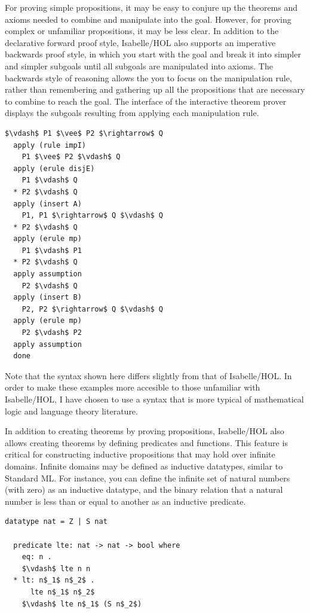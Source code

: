 \documentclass[letterpaper, 11pt]{report}
\begin{document}
For proving simple propositions, it may be easy to conjure up the theorems and axioms needed to
combine and manipulate into the goal. However, for proving complex or unfamiliar propositions,
it may be less clear. In addition to the declarative forward proof style, Isabelle/HOL also
supports an imperative backwards proof style, in which you start with the goal and break it into simpler
and simpler subgoals until all subgoals are manipulated into axioms. The backwards style of reasoning
allows the you to focus on the manipulation rule, rather than remembering and gathering up all the
propositions that are necessary to combine to reach the goal.
The interface of the interactive theorem prover displays the subgoals
resulting from applying each manipulation rule.


\begin{lstlisting}[language=logic, mathescape]
  $\vdash$ P1 $\vee$ P2 $\rightarrow$ Q
  apply (rule impI)
    P1 $\vee$ P2 $\vdash$ Q
  apply (erule disjE)
    P1 $\vdash$ Q
  * P2 $\vdash$ Q
  apply (insert A)
    P1, P1 $\rightarrow$ Q $\vdash$ Q
  * P2 $\vdash$ Q
  apply (erule mp)
    P1 $\vdash$ P1
  * P2 $\vdash$ Q
  apply assumption 
    P2 $\vdash$ Q
  apply (insert B)
    P2, P2 $\rightarrow$ Q $\vdash$ Q
  apply (erule mp)
    P2 $\vdash$ P2
  apply assumption 
  done
\end{lstlisting}

Note that the syntax shown here differs slightly from that of Isabelle/HOL.
In order to make these examples more accesible to those unfamiliar with Isabelle/HOL, I have chosen
to use a syntax that is more typical of mathematical logic and language theory literature.

In addition to creating theorems by proving propositions, Isabelle/HOL also allows creating theorems
by defining predicates and functions. This feature is critical for constructing inductive propositions that may hold
over infinite domains. Infinite domains may be defined as inductive datatypes, similar to Standard ML.
For instance, you can define the infinite set of natural numbers (with zero) as an inductive datatype,
and the binary relation that a natural number is less than or equal to another as an inductive predicate.

\begin{lstlisting}[language=logic]
  datatype nat = Z | S nat
  
  predicate lte: nat -> nat -> bool where
    eq: n . 
    $\vdash$ lte n n
  * lt: n$_1$ n$_2$ . 
      lte n$_1$ n$_2$ 
    $\vdash$ lte n$_1$ (S n$_2$)
\end{lstlisting}
\end{document}
